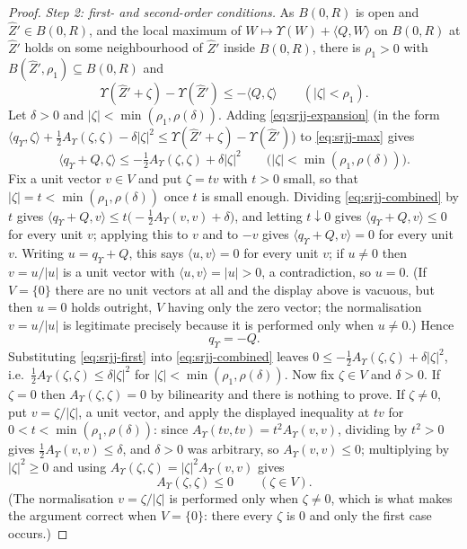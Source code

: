 \begin{proof}
\emph{Step 2: first- and second-order conditions.}
As $B(0,R)$ is open and $\widehat Z'\in B(0,R)$, and the local maximum of
$W\mapsto\Upsilon(W)+\langle Q,W\rangle$ on $B(0,R)$ at $\widehat Z'$ holds on
some neighbourhood of $\widehat Z'$ inside $B(0,R)$, there is $\rho_1>0$ with
$B(\widehat Z',\rho_1)\subseteq B(0,R)$ and
\begin{equation}\label{eq:srjj-max}
  \Upsilon(\widehat Z'+\zeta)-\Upsilon(\widehat Z')
   \le-\langle Q,\zeta\rangle\qquad(|\zeta|<\rho_1).
\end{equation}
Let $\delta>0$ and $|\zeta|<\min(\rho_1,\rho(\delta))$. Adding
\eqref{eq:srjj-expansion} (in the form
$\langle q_\Upsilon,\zeta\rangle+\tfrac12A_\Upsilon(\zeta,\zeta)
-\delta|\zeta|^2\le\Upsilon(\widehat Z'+\zeta)-\Upsilon(\widehat Z')$) to
\eqref{eq:srjj-max} gives
\begin{equation}\label{eq:srjj-combined}
  \langle q_\Upsilon+Q,\zeta\rangle
   \le-\tfrac12A_\Upsilon(\zeta,\zeta)+\delta|\zeta|^2
   \qquad\bigl(|\zeta|<\min(\rho_1,\rho(\delta))\bigr).
\end{equation}
Fix a unit vector $v\in V$ and put $\zeta=tv$ with $t>0$ small, so that
$|\zeta|=t<\min(\rho_1,\rho(\delta))$ once $t$ is small enough. Dividing
\eqref{eq:srjj-combined} by $t$ gives
$\langle q_\Upsilon+Q,v\rangle\le t\bigl(-\tfrac12A_\Upsilon(v,v)
+\delta\bigr)$, and letting $t\downarrow0$ gives
$\langle q_\Upsilon+Q,v\rangle\le0$ for every unit $v$; applying this to $v$ and
to $-v$ gives $\langle q_\Upsilon+Q,v\rangle=0$ for every unit $v$. Writing
$u=q_\Upsilon+Q$, this says $\langle u,v\rangle=0$ for every unit $v$; if
$u\ne0$ then $v=u/|u|$ is a unit vector with $\langle u,v\rangle=|u|>0$, a
contradiction, so $u=0$. (If $V=\{0\}$ there are no unit vectors at all and the
display above is vacuous, but then $u=0$ holds outright, $V$ having only the
zero vector; the normalisation $v=u/|u|$ is legitimate precisely because it is
performed only when $u\ne0$.) Hence
\begin{equation}\label{eq:srjj-first}
  q_\Upsilon=-Q .
\end{equation}
Substituting \eqref{eq:srjj-first} into \eqref{eq:srjj-combined} leaves
$0\le-\tfrac12A_\Upsilon(\zeta,\zeta)+\delta|\zeta|^2$, i.e.\
$\tfrac12A_\Upsilon(\zeta,\zeta)\le\delta|\zeta|^2$ for
$|\zeta|<\min(\rho_1,\rho(\delta))$. Now fix $\zeta\in V$ and $\delta>0$. If
$\zeta=0$ then $A_\Upsilon(\zeta,\zeta)=0$ by bilinearity and there is nothing
to prove. If $\zeta\ne0$, put $v=\zeta/|\zeta|$, a unit vector, and apply the
displayed inequality at $tv$ for $0<t<\min(\rho_1,\rho(\delta))$: since
$A_\Upsilon(tv,tv)=t^2A_\Upsilon(v,v)$, dividing by $t^2>0$ gives
$\tfrac12A_\Upsilon(v,v)\le\delta$, and $\delta>0$ was arbitrary, so
$A_\Upsilon(v,v)\le0$; multiplying by $|\zeta|^2\ge0$ and using
$A_\Upsilon(\zeta,\zeta)=|\zeta|^2A_\Upsilon(v,v)$ gives
\begin{equation}\label{eq:srjj-second}
  A_\Upsilon(\zeta,\zeta)\le0\qquad(\zeta\in V).
\end{equation}
(The normalisation $v=\zeta/|\zeta|$ is performed only when $\zeta\ne0$, which
is what makes the argument correct when $V=\{0\}$: there every $\zeta$ is $0$
and only the first case occurs.)


\end{proof}
